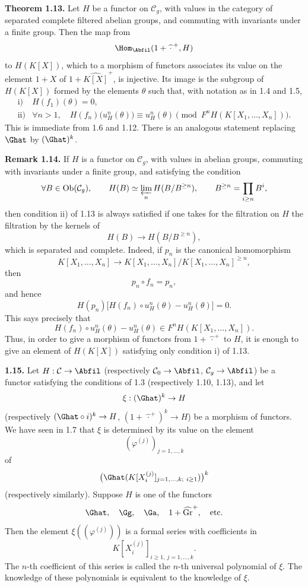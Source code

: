 \documentclass[11pt]{article}
\begin{document}
\textbf{Theorem 1.13.} Let \(H\) be a functor on \(\mathcal C_g\), with values in the category of separated complete filtered abelian groups, and commuting with invariants under a finite group. Then the map from
\[
  \Hom_{\Abfil}(1+\widehat{\,\cdot\,}^{+},H)
\]
to \(H(K[X])\), which to a morphism of functors associates its value on the element \(1+X\) of \(1+\widehat{K[X]}^{+}\), is injective. Its image is the subgroup of \(H(K[X])\) formed by the elements \(\theta\) such that, with notation as in 1.4 and 1.5,
\[
\begin{array}{ll}
\text{i)}&H(f_1)(\theta)=0,\\[0.3em]
\text{ii)}&\forall n>1,\quad
H(f_n)\bigl(u_H^n(\theta)\bigr)\equiv u_H^n(\theta)
 \pmod{F^nH(K[X_1,\ldots,X_n])}.
\end{array}
\]
This is immediate from 1.6 and 1.12. There is an analogous statement replacing \(\Ghat\) by \((\Ghat)^k\).

\textbf{Remark 1.14.} If \(H\) is a functor on \(\mathcal C_g\), with values in abelian groups, commuting with invariants under a finite group, and satisfying the condition
\[
  \forall B\in\operatorname{Ob}(\mathcal C_g),\qquad
  H(B)\simeq \varprojlim_n H(B/B^{\geq n}),
  \qquad B^{\geq n}=\prod_{i\geq n}B^i,
\]
then condition ii) of 1.13 is always satisfied if one takes for the filtration on \(H\) the filtration by the kernels of
\[
  H(B)\longrightarrow H(B/B^{\geq n}),
\]
which is separated and complete. Indeed, if \(p_n\) is the canonical homomorphism
\[
  K[X_1,\ldots,X_n]\longrightarrow K[X_1,\ldots,X_n]/K[X_1,\ldots,X_n]^{\geq n},
\]
then
\[
  p_n\circ f_n=p_n,
\]
and hence
\[
  H(p_n)\bigl[H(f_n)\circ u_H^n(\theta)-u_H^n(\theta)\bigr]=0.
\]
This says precisely that
\[
  H(f_n)\circ u_H^n(\theta)-u_H^n(\theta)
  \in F^nH(K[X_1,\ldots,X_n]).
\]
Thus, in order to give a morphism of functors from \(1+\widehat{\,\cdot\,}^{+}\) to \(H\), it is enough to give an element of \(H(K[X])\) satisfying only condition i) of 1.13.

\textbf{1.15.} Let \(H:\mathcal C\to\Abfil\) (respectively \(\mathcal C_0\to\Abfil\), \(\mathcal C_g\to\Abfil\)) be a functor satisfying the conditions of 1.3 (respectively 1.10, 1.13), and let
\[
  \xi:(\Ghat)^k\to H
\]
(respectively \((\Ghat\circ i)^k\to H\), \((1+\widehat{\,\cdot\,}^{+})^k\to H\)) be a morphism of functors. We have seen in 1.7 that \(\xi\) is determined by its value on the element
\[
  (\varphi^{(j)})_{j=1,\ldots,k}
\]
of
\[
  \bigl(\Ghat(K[X_i^{(j)}]_{j=1,\ldots,k;\ i\geq 1})\bigr)^k
\]
(respectively similarly). Suppose \(H\) is one of the functors
\[
  \Ghat,\quad \Gg,\quad \Ga,\quad 1+\widehat{\operatorname{Gr}}^{+},\quad\text{etc.}
\]
Then the element \(\xi((\varphi^{(j)}))\) is a formal series with coefficients in
\[
  K[X_i^{(j)}]_{i\geq 1,\ j=1,\ldots,k}.
\]
The \(n\)-th coefficient of this series is called the \(n\)-th universal polynomial of \(\xi\). The knowledge of these polynomials is equivalent to the knowledge of \(\xi\).
\end{document}
